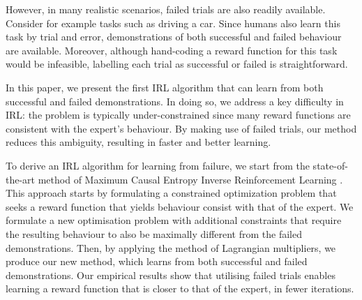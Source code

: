 \documentclass[conference]{IEEEtran}
\begin{document}
%


However, in many realistic scenarios, failed trials are also readily available.  Consider for example tasks such as driving a car.  Since humans also learn this task by trial and error, demonstrations of both successful and failed behaviour are available. Moreover, although hand-coding a reward function for this task would be infeasible, labelling each trial as successful or failed is straightforward.

In this paper, we present the first IRL algorithm that can learn from both successful and failed demonstrations.  In doing so, we address a key difficulty in IRL: the problem is typically under-constrained since many reward functions are consistent with the expert's behaviour.  By making use of failed trials, our method reduces this ambiguity, resulting in faster and better learning.

To derive an IRL algorithm for learning from failure, we start from the state-of-the-art method of Maximum Causal Entropy Inverse Reinforcement Learning \cite{ziebart2008maximum}.  This approach starts by formulating a constrained optimization problem that seeks a reward function that yields behaviour consist with that of the expert.  We formulate a new optimisation problem with additional constraints that require the resulting behaviour to also be maximally different from the failed demonstrations. Then, by applying the method of Lagrangian multipliers, we produce our new method, which learns from both successful and failed demonstrations.
	Our empirical results show that utilising failed trials enables learning  a reward function that is closer to that of the expert, in fewer iterations.



\end{document}
